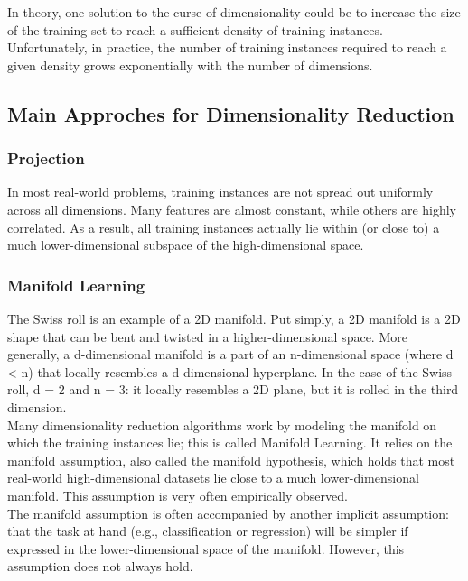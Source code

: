 \documentclass[french]{article}
\begin{document}
In theory, one solution to the curse of dimensionality could be to increase the size of the training set to reach a sufficient density of training instances. Unfortunately, in practice, the number of training instances required to reach a given density grows exponentially with the number of dimensions.

\subsection{Main Approches for Dimensionality Reduction}

\subsubsection{Projection}

In most real-world problems, training instances are not spread out uniformly across all dimensions. Many features are almost constant, while others are highly correlated.  As a result, all training instances actually lie within (or close to) a much lower-dimensional subspace of the high-dimensional space.

\subsubsection{Manifold Learning}

The Swiss roll is an example of a 2D manifold. Put simply, a 2D manifold is a 2D shape that can be bent and twisted in a higher-dimensional space. More generally, a d-dimensional manifold is a part of an n-dimensional space (where d < n) that locally resembles a d-dimensional hyperplane. In the case of the Swiss roll, d = 2 and n = 3: it locally resembles a 2D plane, but it is rolled in the third dimension. \\

Many dimensionality reduction algorithms work by modeling the manifold on which the training instances lie; this is called Manifold Learning. It relies on the manifold assumption, also called the manifold hypothesis, which holds that most real-world high-dimensional datasets lie close to a much lower-dimensional manifold. This assumption is very often empirically observed.\\

The manifold assumption is often accompanied by another implicit assumption: that the task at hand (e.g., classification or regression) will be simpler if expressed in the lower-dimensional space of the manifold. However, this assumption does not always hold.
\end{document}

